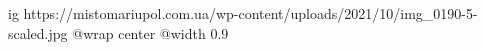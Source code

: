  
 
 
 
 

\ifcmt
  ig https://mistomariupol.com.ua/wp-content/uploads/2021/10/img_0190-5-scaled.jpg
  @wrap center
  @width 0.9
\fi
